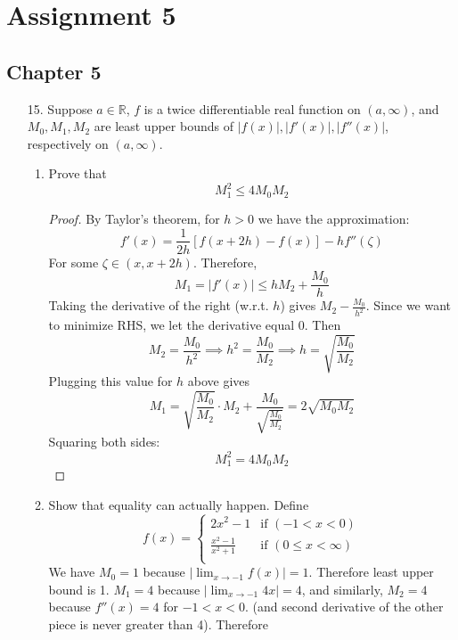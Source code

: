 \documentclass[hidelinks,12pt]{article}
\title{\scalebox{1.5}{Math 723 Homework 5}}
\author{\scalebox{1.5}{Theo Koss}}
\date{November 2024}
\renewcommand{\leq}{\leqslant}
\newcommand{\R}{\mathbb{R}}
\begin{document}
\maketitle
\section*{Assignment 5}
\subsection*{Chapter 5}
\begin{enumerate}
    \item[15.] Suppose \(a\in\R\), \(f\) is a twice differentiable real function on \((a,\infty)\), and \(M_{0},M_{1},M_{2}\) are least upper bounds of \(|f(x)|,|f'(x)|,|f''(x)|\), respectively on \((a,\infty)\). 
        \begin{enumerate}[label=(\alph*).]
            \item Prove that \[
    M_{1}^{2}\leq 4M_{0}M_{2}
    \]
    \begin{proof}
   By Taylor's theorem, for \(h>0\) we have the approximation: \[
       f'(x)=\frac{1}{2h}\left[f(x+2h)-f(x)\right]-hf''(\zeta) 
   \]
  For some \(\zeta\in(x,x+2h)\). Therefore, \[
  M_{1}=|f'(x)|\leq hM_{2}+\frac{M_{0}}{h}
  \]
Taking the derivative of the right (w.r.t. \(h\)) gives \(M_{2}-\frac{M_{0}}{h^{2}}\). Since we want to minimize RHS, we let the derivative equal 0. Then \[
    M_{2}=\frac{M_{0}}{h^{2}}\implies h^{2}=\frac{M_{0}}{M_{2}}\implies h=\sqrt{\frac{M_{0}}{M_{2}}}
\]
Plugging this value for \(h\) above gives 
\[
    M_{1}=\sqrt{\frac{M_{0}}{M_{2}}}\cdot M_{2}+\frac{M_{0}}{\sqrt{\frac{M_{0}}{M_{2}}}}=2\sqrt{M_{0}M_{2}}
\]
Squaring both sides:\[
M_{1}^{2}=4M_{0}M_{2}
\]
   \end{proof}
            \item Show that equality can actually happen. Define \[
            f(x)=\begin{cases}
            2x^{2}-1 & \text{if }(-1<x<0)\\
             \frac{x^{2}-1}{x^{2}+1}& \text{if }(0\leq x<\infty)\\
            \end{cases}
            \]
           We have \(M_{0}=1\) because \(|\lim_{x\to-1}f(x)|=1\). Therefore least upper bound is 1. \(M_{1}=4\) because \(|\lim_{x\to-1}4x|=4\), and similarly, \(M_{2}=4\) because \(f''(x)=4\) for \(-1<x<0\). (and second derivative of the other piece is never greater than 4). Therefore
           \[
\]
\end{enumerate}
\end{enumerate}
\end{document}
